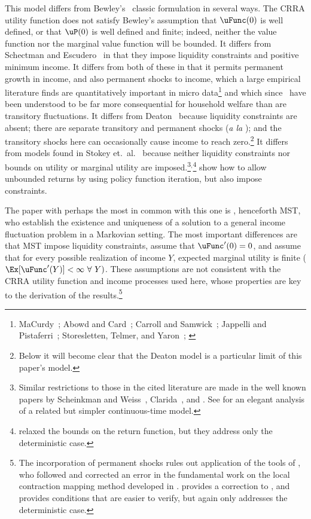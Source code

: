 \documentclass[BufferStockTheory]{subfiles}
\begin{document}
\hypertarget{DiffFromLit}{} This model differs from Bewley's~\citeyearpar{bewleyPIH} classic formulation in several ways. The CRRA utility function does not satisfy Bewley's assumption that $\uFunc(0)$ is well defined, or that $\uP(0)$ is well defined and finite; indeed, neither the value function nor the marginal value function will be bounded.  It differs from Schectman and Escudero~\citeyearpar{seIncFluct} in that they impose liquidity constraints and positive minimum income.  It differs from both of these in that it permits permanent growth in income, and also permanent shocks to income, which a large empirical literature finds are quantitatively important in micro data\footnote{MaCurdy~\citeyearpar{macurdyTimeseries}; Abowd and Card~\citeyearpar{acCovariance}; Carroll and Samwick~\citeyearpar{csNature}; Jappelli and Pistaferri~\citeyearpar{jpCins}; Storesletten, Telmer, and Yaron~\citeyearpar{styConsumption}; \cite{blpRisk}} and which since~\cite{friedmanATheory} have been understood to be far more consequential for household welfare than are transitory fluctuations.  It differs from Deaton~\citeyearpar{deatonLiqConstr} because liquidity constraints are absent; there are separate transitory and permanent shocks ({\it a la} \cite{muthOptimal}); and the transitory shocks here can occasionally cause income to reach zero.\footnote{Below it will become clear that the Deaton model is a particular limit of this paper's model.}  It differs from models found in Stokey et.\ al.~\citeyearpar{slpMethods} because neither liquidity constraints nor bounds on utility or marginal utility are imposed.\footnote{Similar restrictions to those in the cited literature are made in the well known papers by Scheinkman and Weiss~\citeyearpar{scheinkman&weiss:borrowing}, Clarida~\citeyearpar{claridaErgodic}, and \cite{cwcUnderUncert}.  See \cite{tocheUrisk} for an elegant analysis of a related but simpler continuous-time model.}$^{,}$\footnote{\cite{asHomogeneous} relaxed the bounds on the return function, but they address only the deterministic case.} \cite{lsIncFluct} show how to allow unbounded returns by using policy function iteration, but also impose constraints.

The paper with perhaps the most in common with this one is \cite{mstIncFluct}, henceforth MST, who establish the existence and uniqueness of a solution to a general income fluctuation problem in a Markovian setting.  The most important differences are that MST impose liquidity constraints, assume that $\uFunc^{\prime}(0)=0$, and  assume that for every possible realization of income $Y$, expected marginal utility is finite ($\Ex[\uFunc^{\prime}(Y)]<\infty ~\forall~Y)$.  These assumptions are not consistent with the CRRA utility function and income processes used here, whose properties are key to the derivation of the results.\footnote{The incorporation of permanent shocks rules out application of the tools of \cite{mnUnique}, who followed and corrected an error in the fundamental work on the local contraction mapping method developed in \cite{rrExistence}.  \cite{mvExistence} provides a correction to \cite{rrExistence}, and provides conditions that are easier to verify, but again only addresses the deterministic case.}
\end{document}
